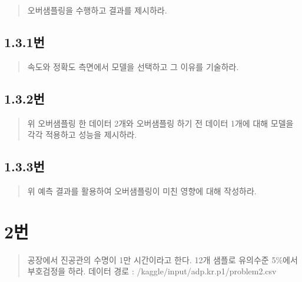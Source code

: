 \documentclass[
  letterpaper,
  DIV=11,
  numbers=noendperiod]{scrreprt}
\begin{document}

\begin{quote}
오버샘플링을 수행하고 결과를 제시하라.
\end{quote}

\hypertarget{uxbc88-84}{%
\section*{1.3.1번}\label{uxbc88-84}}


\begin{quote}
속도와 정확도 측면에서 모델을 선택하고 그 이유를 기술하라.
\end{quote}

\hypertarget{uxbc88-85}{%
\section*{1.3.2번}\label{uxbc88-85}}


\begin{quote}
위 오버샘플링 한 데이터 2개와 오버샘플링 하기 전 데이터 1개에 대해
모델을 각각 적용하고 성능을 제시하라.
\end{quote}

\hypertarget{uxbc88-86}{%
\section*{1.3.3번}\label{uxbc88-86}}


\begin{quote}
위 예측 결과를 활용하여 오버샘플링이 미친 영향에 대해 작성하라.
\end{quote}

\hypertarget{uxbc88-87}{%
\chapter*{2번}\label{uxbc88-87}}


\begin{quote}
공장에서 진공관의 수명이 1만 시간이라고 한다. 12개 샘플로 유의수준
5\%에서 부호검정을 하라. 데이터 경로 :
/kaggle/input/adp.kr.p1/problem2.csv
\end{quote}
\end{document}
